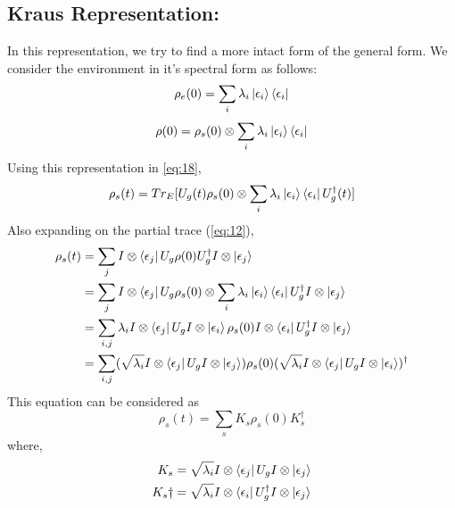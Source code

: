 \subsection{Kraus Representation:}
In this representation, we try to find a more intact form of the general form.
We consider the environment in it's spectral form as follows:
\begin{equation} \label{eq:18}
    \rho_e(0) = \sum_i \lambda_i \ket{\epsilon_i}\bra{\epsilon_i}
\end{equation}
\begin{equation}
    \rho(0) = \rho_s(0) \otimes \sum_i \lambda_i \ket{\epsilon_i}\bra{\epsilon_i}
\end{equation}
Using this representation in \ref{eq:18},
\begin{equation}
    \rho_s(t) = Tr_E[U_g(t)\rho_s(0) \otimes \sum_i \lambda_i \ket{\epsilon_i}\bra{\epsilon_i}U_g^\dagger(t)]
\end{equation}
Also expanding on the partial trace (\ref{eq:12}),
\begin{equation}
\begin{aligned}
    \rho_s(t) &= \sum_j I \otimes \bra{\epsilon_j} U_g \rho(0) U_g^\dagger I \otimes \ket{\epsilon_j} \\
    & = \sum_j I \otimes \bra{\epsilon_j} U_g \rho_s(0) \otimes \sum_i \lambda_i \ket{\epsilon_i}\bra{\epsilon_i} U_g^\dagger I \otimes \ket{\epsilon_j} \\
    &= \sum_{i,j} \lambda_i I \otimes \bra{\epsilon_j} U_g I \otimes \ket{\epsilon_i} \rho_s(0) I \otimes \bra{\epsilon_i} U_g^\dagger I \otimes \ket{\epsilon_j} \\
    &= \sum_{i,j} (\sqrt{\lambda_i} I \otimes \bra{\epsilon_j} U_g I \otimes \ket{\epsilon_j}) \rho_s(0) (\sqrt{\lambda_i} I \otimes \bra{\epsilon_j} U_g I \otimes \ket{\epsilon_i})^\dagger
\end{aligned}
\end{equation}
This equation can be considered as
\begin{equation}
    \rho_s(t) = \sum_s K_s \rho_s(0) K_s^\dagger
\end{equation}
where, 
\begin{equation}
\begin{aligned}
    K_s &= \sqrt{\lambda_i} I \otimes \bra{\epsilon_j} U_g I \otimes \ket{\epsilon_j} \\
    K_s\dagger &= \sqrt{\lambda_i} I \otimes \bra{\epsilon_i} U_g^\dagger I \otimes \ket{\epsilon_j} 
\end{aligned}
\end{equation}

